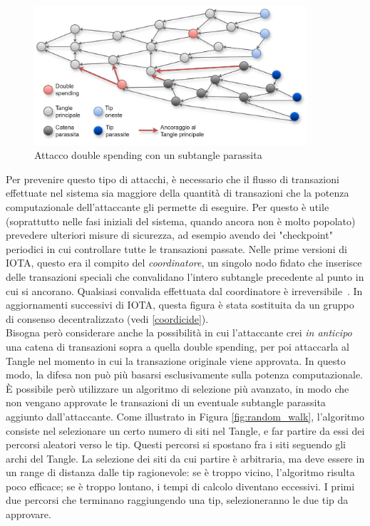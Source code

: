 \documentclass[12pt,a4paper,openright,twoside]{report}
\begin{document}
\begin{figure}[h]
\begin{center}
\includegraphics[width=0.9\textwidth]{figures/my_tangle_attack.png}
\caption[Attacco double spending]{Attacco double spending con un subtangle parassita}\label{fig:tangle_attack}
\end{center}
\end{figure}
Per prevenire questo tipo di attacchi, è necessario che il flusso di transazioni effettuate nel sistema sia maggiore della quantità di transazioni che la potenza computazionale dell'attaccante gli permette di eseguire. Per questo è utile (soprattutto nelle fasi iniziali del sistema, quando ancora non è molto popolato) prevedere ulteriori misure di sicurezza, ad esempio avendo dei "checkpoint" periodici in cui controllare tutte le transazioni passate. Nelle prime versioni di IOTA, questo era il compito del \textit{coordinatore}, un singolo nodo fidato che inserisce delle transazioni speciali che convalidano l'intero subtangle precedente al punto in cui si ancorano. Qualsiasi convalida effettuata dal coordinatore è irreversibile~\cite{coordinator}. In aggiornamenti successivi di IOTA, questa figura è stata sostituita da un gruppo di consenso decentralizzato (vedi \ref{coordicide}).\\
Bisogna però considerare anche la possibilità in cui l'attaccante crei \textit{in anticipo} una catena di transazioni sopra a quella double spending, per poi attaccarla al Tangle nel momento in cui la transazione originale viene approvata. In questo modo, la difesa non può più basarsi esclusivamente sulla potenza computazionale. È possibile però utilizzare un algoritmo di selezione più avanzato, in modo che non vengano approvate le transazioni di un eventuale subtangle parassita aggiunto dall'attaccante. Come illustrato in Figura \ref{fig:random_walk}, l'algoritmo consiste nel selezionare un certo numero di siti nel Tangle, e far partire da essi dei percorsi aleatori verso le tip. Questi percorsi si spostano fra i siti seguendo gli archi del Tangle. La selezione dei siti da cui partire è arbitraria, ma deve essere in un range di distanza dalle tip ragionevole: se è troppo vicino, l'algoritmo risulta poco efficace; se è troppo lontano, i tempi di calcolo diventano eccessivi. I primi due percorsi che terminano raggiungendo una tip, selezioneranno le due tip da approvare.
\end{document}
